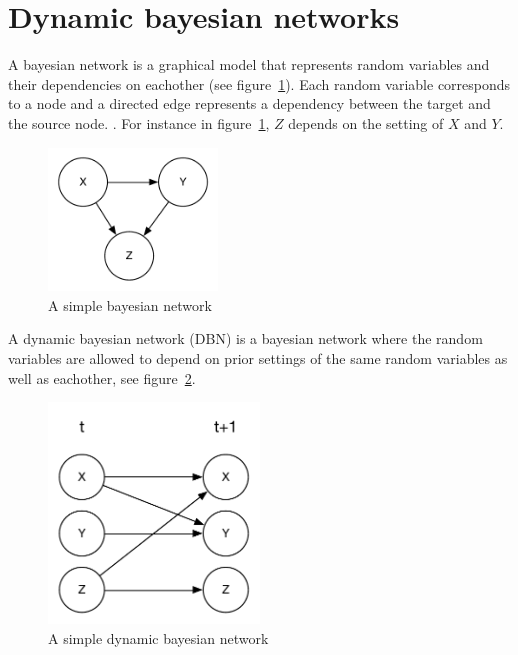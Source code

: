 \section{Dynamic bayesian networks}
\label{sec:dbn}

A bayesian network is a graphical model that represents random variables and
their dependencies on eachother (see figure~\ref{fig:bn}). Each random variable
corresponds to a node and a directed edge represents a dependency between the
target and the source node. \parencite{heckerman1998tutorial}. For instance in
figure~\ref{fig:bn}, $Z$ depends on the setting of $X$ and $Y$. 

\begin{figure}[H]
\centering
\includegraphics[width=0.4\textwidth]{images/BN.pdf}
\caption{A simple bayesian network}
\label{fig:bn}
\end{figure}

A dynamic bayesian network (DBN) is a bayesian network where the random
variables are allowed to depend on prior settings of the same random variables
as well as eachother, see figure~\ref{fig:dbn}.

\begin{figure}[H]
    \centering
    \includegraphics[width=0.5\textwidth]{images/DBN.pdf}
    \caption{A simple dynamic bayesian network}
    \label{fig:dbn}
\end{figure}

